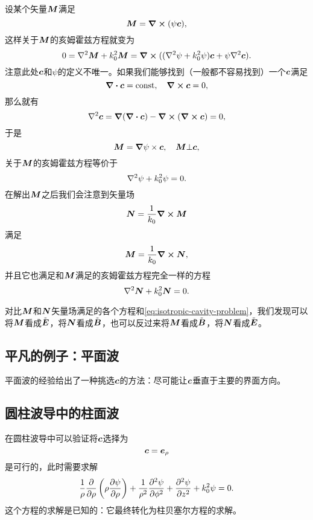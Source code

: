 设某个矢量$\vb*{M}$满足
\begin{equation}
    {\vb*{M}} = \curl{(\psi \vb*{c})},
\end{equation}
这样关于$\vb*{M}$的亥姆霍兹方程就变为
\[
    0 = \laplacian {\vb*{M}} + k_0^2 {\vb*{M}} = \curl{((\laplacian \psi + k_0^2 \psi) \vb*{c} + \psi \laplacian \vb*{c})}.
\]
注意此处$\vb*{c}$和$\psi$的定义不唯一。如果我们能够找到（一般都不容易找到）一个$\vb*{c}$满足
\begin{equation}
    \div{\vb*{c}} = \text{const}, \quad \curl{\vb*{c}} = 0,
\end{equation}
那么就有
\[
    \laplacian \vb*{c} = \grad(\div{\vb*{c}}) - \curl{(\curl{\vb*{c}})} = 0,
\]
于是
\begin{equation}
    \vb*{M} = \grad{\psi} \times \vb*{c}, \quad \vb*{M} \bot \vb*{c},
\end{equation}
关于$\vb*{M}$的亥姆霍兹方程等价于
\begin{equation}
    \laplacian \psi + k_0^2 \psi = 0.
\end{equation}
在解出$\vb*{M}$之后我们会注意到矢量场
\begin{equation}
    \vb*{N} = \frac{1}{k_0} \curl{\vb*{M}}
\end{equation}
满足
\begin{equation}
    \vb*{M} = \frac{1}{k_0} \curl{\vb*{N}}, 
\end{equation}
并且它也满足和$\vb*{M}$满足的亥姆霍兹方程完全一样的方程
\begin{equation}
    \laplacian \vb*{N} + k_0^2 \vb*{N} = 0.
\end{equation}

对比$\vb*{M}$和$\vb*{N}$矢量场满足的各个方程和\eqref{eq:isotropic-cavity-problem}，我们发现可以将$\vb*{M}$看成$\tilde{\vb*{E}}$，将$\vb*{N}$看成$\tilde{\vb*{B}}$，也可以反过来将$\vb*{M}$看成$\tilde{\vb*{B}}$，将$\vb*{N}$看成$\tilde{\vb*{E}}$。

\subsection{平凡的例子：平面波}

平面波的经验给出了一种挑选$\vb*{c}$的方法：尽可能让$\vb*{c}$垂直于主要的界面方向。

\subsection{圆柱波导中的柱面波}

在圆柱波导中可以验证将$\vb*{c}$选择为
\begin{equation}
    \vb*{c} = \vb*{e}_\rho
\end{equation}
是可行的，此时需要求解
\begin{equation}
    \frac{1}{\rho} \pdv{\rho} \left( \rho \pdv{\psi}{\rho} \right) + \frac{1}{\rho^2} \pdv[2]{\psi}{\phi} + \pdv[2]{\psi}{z} + k_0^2 \psi = 0.
\end{equation}
这个方程的求解是已知的：它最终转化为柱贝塞尔方程的求解。


